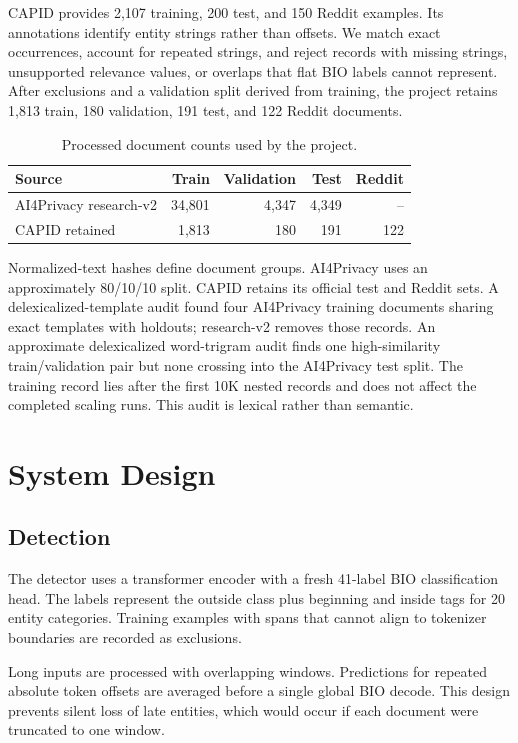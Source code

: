 \documentclass[conference]{IEEEtran}
\begin{document}
CAPID provides 2,107 training, 200 test, and 150 Reddit examples. Its annotations identify entity strings rather than offsets. We match exact occurrences, account for repeated strings, and reject records with missing strings, unsupported relevance values, or overlaps that flat BIO labels cannot represent. After exclusions and a validation split derived from training, the project retains 1,813 train, 180 validation, 191 test, and 122 Reddit documents.

\begin{table}[t]
\centering
\caption{Processed document counts used by the project.}
\label{tab:data}
\begin{tabular}{lrrrr}
\toprule
Source & Train & Validation & Test & Reddit \\
\midrule
AI4Privacy research-v2 & 34,801 & 4,347 & 4,349 & -- \\
CAPID retained & 1,813 & 180 & 191 & 122 \\
\bottomrule
\end{tabular}
\end{table}

Normalized-text hashes define document groups. AI4Privacy uses an approximately 80/10/10 split. CAPID retains its official test and Reddit sets. A delexicalized-template audit found four AI4Privacy training documents sharing exact templates with holdouts; research-v2 removes those records. An approximate delexicalized word-trigram audit finds one high-similarity train/validation pair but none crossing into the AI4Privacy test split. The training record lies after the first 10K nested records and does not affect the completed scaling runs. This audit is lexical rather than semantic.

\section{System Design}
\subsection{Detection}
The detector uses a transformer encoder with a fresh 41-label BIO classification head. The labels represent the outside class plus beginning and inside tags for 20 entity categories. Training examples with spans that cannot align to tokenizer boundaries are recorded as exclusions.

Long inputs are processed with overlapping windows. Predictions for repeated absolute token offsets are averaged before a single global BIO decode. This design prevents silent loss of late entities, which would occur if each document were truncated to one window.
\end{document}
